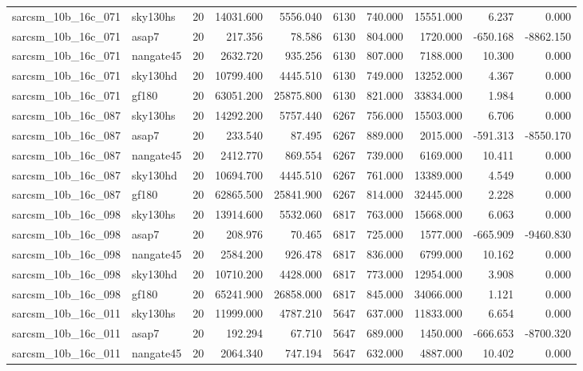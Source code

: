 \documentclass{article}
\begin{document}
\begin{longtable}{llrrrrrrrr}
sarcsm\_10b\_16c\_071 & sky130hs & 20 & 14031.600 & 5556.040 & 6130 & 740.000 & 15551.000 & 6.237 & 0.000 \\
sarcsm\_10b\_16c\_071 & asap7 & 20 & 217.356 & 78.586 & 6130 & 804.000 & 1720.000 & -650.168 & -8862.150 \\
sarcsm\_10b\_16c\_071 & nangate45 & 20 & 2632.720 & 935.256 & 6130 & 807.000 & 7188.000 & 10.300 & 0.000 \\
sarcsm\_10b\_16c\_071 & sky130hd & 20 & 10799.400 & 4445.510 & 6130 & 749.000 & 13252.000 & 4.367 & 0.000 \\
sarcsm\_10b\_16c\_071 & gf180 & 20 & 63051.200 & 25875.800 & 6130 & 821.000 & 33834.000 & 1.984 & 0.000 \\
sarcsm\_10b\_16c\_087 & sky130hs & 20 & 14292.200 & 5757.440 & 6267 & 756.000 & 15503.000 & 6.706 & 0.000 \\
sarcsm\_10b\_16c\_087 & asap7 & 20 & 233.540 & 87.495 & 6267 & 889.000 & 2015.000 & -591.313 & -8550.170 \\
sarcsm\_10b\_16c\_087 & nangate45 & 20 & 2412.770 & 869.554 & 6267 & 739.000 & 6169.000 & 10.411 & 0.000 \\
sarcsm\_10b\_16c\_087 & sky130hd & 20 & 10694.700 & 4445.510 & 6267 & 761.000 & 13389.000 & 4.549 & 0.000 \\
sarcsm\_10b\_16c\_087 & gf180 & 20 & 62865.500 & 25841.900 & 6267 & 814.000 & 32445.000 & 2.228 & 0.000 \\
sarcsm\_10b\_16c\_098 & sky130hs & 20 & 13914.600 & 5532.060 & 6817 & 763.000 & 15668.000 & 6.063 & 0.000 \\
sarcsm\_10b\_16c\_098 & asap7 & 20 & 208.976 & 70.465 & 6817 & 725.000 & 1577.000 & -665.909 & -9460.830 \\
sarcsm\_10b\_16c\_098 & nangate45 & 20 & 2584.200 & 926.478 & 6817 & 836.000 & 6799.000 & 10.162 & 0.000 \\
sarcsm\_10b\_16c\_098 & sky130hd & 20 & 10710.200 & 4428.000 & 6817 & 773.000 & 12954.000 & 3.908 & 0.000 \\
sarcsm\_10b\_16c\_098 & gf180 & 20 & 65241.900 & 26858.000 & 6817 & 845.000 & 34066.000 & 1.121 & 0.000 \\
sarcsm\_10b\_16c\_011 & sky130hs & 20 & 11999.000 & 4787.210 & 5647 & 637.000 & 11833.000 & 6.654 & 0.000 \\
sarcsm\_10b\_16c\_011 & asap7 & 20 & 192.294 & 67.710 & 5647 & 689.000 & 1450.000 & -666.653 & -8700.320 \\
sarcsm\_10b\_16c\_011 & nangate45 & 20 & 2064.340 & 747.194 & 5647 & 632.000 & 4887.000 & 10.402 & 0.000 \\

\end{longtable}
\end{document}
